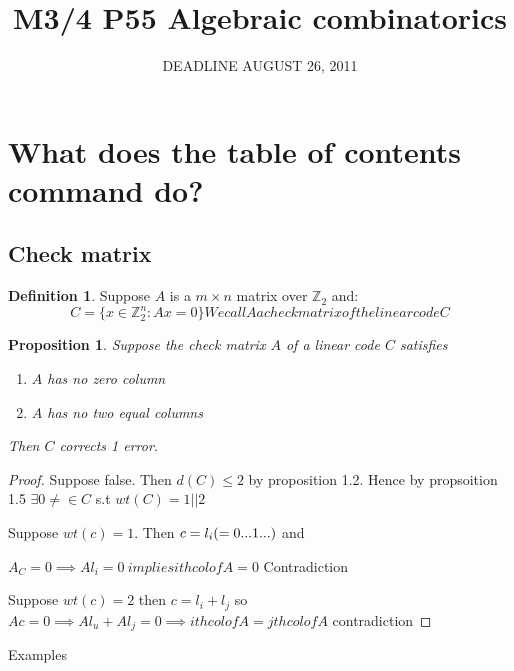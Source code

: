 \documentclass[amsfonts]{amsart}
\title{M3/4 P55 Algebraic combinatorics}
\date{DEADLINE AUGUST 26, 2011}
\newtheorem{prop}[thm]{Proposition}
\theoremstyle{definition}
\newtheorem{defn}[thm]{Definition}
\theoremstyle{remark}
\numberwithin{equation}{section}
\begin{document}
\begin{abstract}
\end{abstract}

\maketitle

\tableofcontents

\section{What does the table of contents command do?}

\subsection{Check matrix}

\begin{defn}
Suppose \(A\) is a \(m \times n\) matrix over \(\mathbb{Z}_2\) and:
\begin{equation*}
C = \{ x \in \mathbb{Z}_2^n : Ax = 0\}
We call A a check matrix of the linear code C
\end{equation*}
\end{defn}

\begin{prop}
Suppose the check matrix \(A\) of a linear code \(C\) satisfies

\begin{enumerate}
	\item \(A\) has no zero column
	\item \(A\) has no two equal columns
\end{enumerate}
Then \(C\) corrects 1 error.
\end{prop}

\begin{proof}
Suppose false. Then \(d(C) \leq 2\) by proposition 1.2.
Hence by propsoition 1.5 \(\exists 0\neq \in C\) s.t \(wt(C) = 1 || 2\)

Suppose \(wt(c) = 1\). Then \(c = l_i \space(=0 ... 1 ...)\) and 

\(A_C = 0 \implies Al_i = 0 \ implies ith col of A = 0\) Contradiction

Suppose \(wt(c) = 2 \) then \(c = l_i + l_j\) so 
\(Ac = 0 \implies Al_u + Al_j = 0 \implies ith col of A = jth col of A\) contradiction
\end{proof}

Examples
\end{document}
